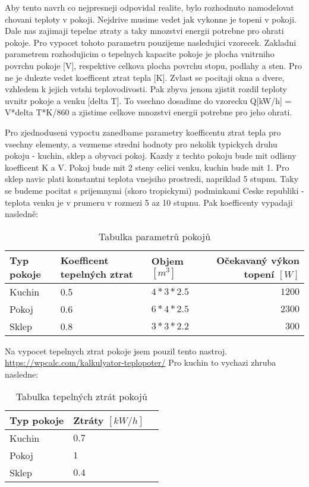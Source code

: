 Aby tento navrh co nejpresneji odpovidal realite, bylo rozhodnuto namodelovat chovani teploty v pokoji.
Nejdrive musime vedet jak vykonne je topeni v pokoji. Dale nas zajimaji tepelne ztraty a taky mnozstvi energii potrebne pro ohrati pokoje. Pro vypocet tohoto parametru pouzijeme nasledujici vzorecek. Zakladni parametrem rozhodujicim o tepelnych kapacite pokoje je plocha vnitrniho povrchu pokoje [V], respektive celkova plocha povrchu stopu, podlahy a sten. Pro ne je dulezte vedet koefficent ztrat tepla [K]. Zvlast se pocitaji okna a dvere, vzhledem k jejich vetshi teplovodivosti. Pak zbyva jenom zjistit rozdil teploty uvnitr pokoje a venku [delta T]. To vsechno dosadime do vzorecku Q[kW/h] = V*delta T*K/860 a zjistime celkove mnozstvi energii potrebne pro jeho ohrati. \cite{tep_calc}

Pro zjednoduseni vypoctu zanedbame parametry koefficentu ztrat tepla pro vsechny elementy, a vezmeme stredni hodnoty pro nekolik typickych druhu pokoju - kuchin, sklep a obyvaci pokoj. Kazdy z techto pokoju bude mit odlisny koefficent K a V. Pokoj bude mit 2 steny celici venku, kuchin bude mit 1. Pro sklep navic plati konstantni teplota vnejsiho prostredi, napriklad 5 stupnu. Taky se budeme pocitat s prijemnymi (skoro tropickymi) podminkami Ceske republiki - teplota venku je v prumeru v rozmezi 5 az 10 stupnu. \cite{cesko}
Pak koefficenty vypadaji nasledně:

\begin{table}[H]
	\vskip6pt
	\caption{Tabulka parametrů pokojů}
    \vskip6pt
	\centering
	\begin{tabular}{lllr}
		\toprule
		Typ pokoje & Koefficent tepelných ztrat & Objem $[m^3]$ & Očekavaný výkon topení $[W]$ \\
    \midrule
    Kuchin & 0.5 & $4*3*2.5$ & $1200$ \\
    Pokoj & 0.6 & $6*4*2.5$ & $2300$ \\
    Sklep & 0.8 & $3*3*2.2$ & $300$ \\
		\bottomrule
	\end{tabular}
	\label{tab:TepelneZtraty}
\end{table}

Na vypocet tepelnych ztrat pokoje jsem pouzil tento nastroj. \url{https://wpcalc.com/kalkulyator-teplopoter/}
Pro kuchin to vychazi zhruba nasledne:

\begin{table}[H]
	\vskip6pt
	\caption{Tabulka tepelných ztrát pokojů} 
    \vskip6pt
	\centering
	\begin{tabular}{llr}
		\toprule
		Typ pokoje & Ztráty $[kW/h]$ \\
		\midrule
		Kuchin & $0.7$ \\
    Pokoj & $1$ \\
    Sklep & $0.4$ \\
		\bottomrule
	\end{tabular}
	\label{tab:TepelneZtraty}
\end{table}

